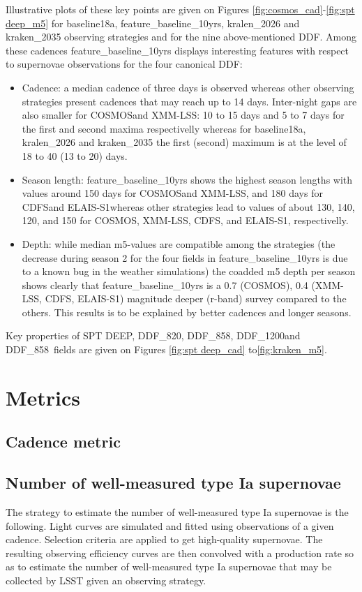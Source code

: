 \documentclass [11pt,a4paper]{article}
\newcommand{\cosmos}{COSMOS}
\newcommand{\xmmlss}{XMM-LSS}
\newcommand{\cdfs}{CDFS}
\newcommand{\elais}{ELAIS-S1}
\newcommand{\spt}{SPT DEEP}
\newcommand{\ddfa}{DDF\_820}
\newcommand{\ddfb}{DDF\_858}
\newcommand{\ddfc}{DDF\_1200}
\begin{document}
Illustrative plots of these key points are given on Figures \ref{fig:cosmos_cad}-\ref{fig:spt deep_m5} for baseline18a, feature\_baseline\_10yrs, kralen\_2026 and kraken\_2035 observing strategies and for the nine above-mentioned DDF. Among these cadences feature\_baseline\_10yrs displays interesting features with respect to supernovae observations for the four canonical DDF:
\begin{itemize}
\item Cadence: a median cadence of three days is observed whereas other observing strategies present cadences that may reach up to 14 days. Inter-night gaps are also smaller for \cosmos and \xmmlss: 10 to 15 days and 5 to 7 days for the first and second maxima respectivelly whereas  for baseline18a, kralen\_2026 and kraken\_2035 the first (second) maximum is at the level of 18 to 40 (13 to 20) days.  
\item Season length: feature\_baseline\_10yrs shows the highest season lengths with values around 150 days for \cosmos and \xmmlss, and 180 days for \cdfs and \elais whereas other strategies lead to values of about 130, 140, 120, and 150 for \cosmos, \xmmlss, \cdfs, and \elais, respectivelly.
\item Depth: while median m5-values are compatible among the strategies (the decrease during season 2 for the four fields in  feature\_baseline\_10yrs is due to a known bug in the weather simulations) the coadded m5 depth per season shows clearly that feature\_baseline\_10yrs is a 0.7 (\cosmos), 0.4 (\xmmlss, \cdfs, \elais) magnitude deeper (r-band) survey compared to the others. This results is to be explained by better cadences and longer seasons.
 
\end{itemize}
Key properties of \spt, \ddfa, \ddfb, \ddfc and \ddfb~fields are given on Figures \ref{fig:spt deep_cad} to\ref{fig:kraken_m5}.

\section {Metrics}

\subsection {Cadence metric }

\subsection{ Number of well-measured type Ia supernovae}
The strategy to estimate the number of well-measured type Ia supernovae is the following. Light curves are simulated and fitted using observations of a given cadence. Selection criteria are applied to get high-quality supernovae. The resulting observing efficiency curves are then convolved with a production rate so as to estimate the number of well-measured type Ia supernovae that may be collected by LSST  given an observing strategy. 
\end{document}
